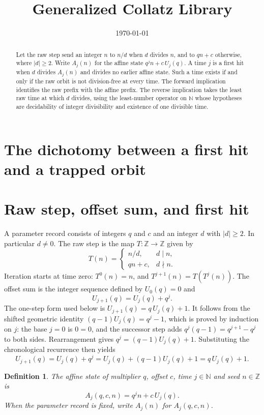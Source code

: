 \documentclass[11pt,letterpaper]{article}
\title{Generalized Collatz Library}
\author{}
\date{\today}
\newcommand{\N}{\mathbb{N}}
\newcommand{\Z}{\mathbb{Z}}
\newcommand{\Map}[3]{#1 \colon #2 \to #3}
\newtheorem{definition}[theorem]{Definition}
\begin{document}
\maketitle
\section*{The dichotomy between a first hit and a trapped orbit}

\begin{abstract}
Let the raw step send an integer \(n\) to \(n/d\) when \(d\) divides \(n\), and to \(qn+c\) otherwise, where \(|d|\ge 2\). Write \(A_j(n)\) for the affine state \(q^j n+c\,U_j(q)\). A time \(j\) is a first hit when \(d\) divides \(A_j(n)\) and divides no earlier affine state. Such a time exists if and only if the raw orbit is not division-free at every time. The forward implication identifies the raw prefix with the affine prefix. The reverse implication takes the least raw time at which \(d\) divides, using the least-number operator on \(\N\) whose hypotheses are decidability of integer divisibility and existence of one divisible time.
\end{abstract}

\section{Raw step, offset sum, and first hit}

A parameter record consists of integers \(q\) and \(c\) and an integer \(d\) with \(|d|\ge 2\). In particular \(d\neq 0\). The raw step is the map \(\Map{T}{\Z}{\Z}\) given by
\[
T(n)=\begin{cases}
n/d, & d\mid n,\\
qn+c, & d\nmid n.
\end{cases}
\]
Iteration starts at time zero: \(T^{0}(n)=n\), and \(T^{j+1}(n)=T(T^{j}(n))\). The offset sum is the integer sequence defined by \(U_{0}(q)=0\) and
\[
U_{j+1}(q)=U_{j}(q)+q^{j}.
\]
The one-step form used below is \(U_{j+1}(q)=q\,U_{j}(q)+1\). It follows from the shifted geometric identity \((q-1)U_{j}(q)=q^{j}-1\), which is proved by induction on \(j\): the base \(j=0\) is \(0=0\), and the successor step adds \(q^{j}(q-1)=q^{j+1}-q^{j}\) to both sides. Rearrangement gives \(q^{j}=(q-1)U_{j}(q)+1\). Substituting the chronological recurrence then yields
\[
U_{j+1}(q)=U_{j}(q)+q^{j}=U_{j}(q)+(q-1)U_{j}(q)+1=q\,U_{j}(q)+1.
\]

\begin{definition}\label{Def:AffineState}
The affine state of multiplier \(q\), offset \(c\), time \(j\in\N\) and seed \(n\in\Z\) is
\[
A_{j}(q,c,n)=q^{j}n+c\,U_{j}(q).
\]
When the parameter record is fixed, write \(A_{j}(n)\) for \(A_{j}(q,c,n)\).
\end{definition}
\end{document}
